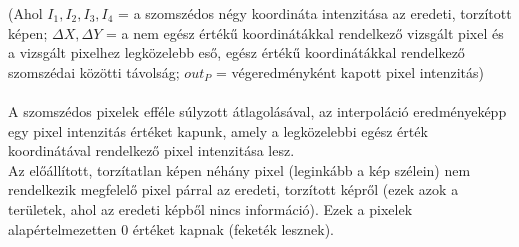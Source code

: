 \documentclass[12pt]{report}
\begin{document}
\begin{enumerate}
\begin{itemize}
                        (Ahol $I_1, I_2, I_3, I_4$ = a szomszédos négy koordináta intenzitása az eredeti, torzított képen; $\Delta X, \Delta Y$ = a nem egész értékű koordinátákkal rendelkező vizsgált pixel és a vizsgált pixelhez legközelebb eső, egész értékű koordinátákkal rendelkező szomszédai közötti távolság; $out_P$ = végeredményként kapott pixel intenzitás)\\\\
                    A szomszédos pixelek efféle súlyzott átlagolásával, az interpoláció eredményeképp egy pixel intenzitás értéket kapunk, amely a legközelebbi egész érték koordinátával rendelkező pixel intenzitása lesz.\\
                    Az előállított, torzítatlan képen néhány pixel (leginkább a kép szélein) nem rendelkezik megfelelő pixel párral az eredeti, torzított képről (ezek azok a területek, ahol az eredeti képből nincs információ). Ezek a pixelek alapértelmezetten 0 értéket kapnak (feketék lesznek). 
                        \end{itemize}
                \end{enumerate}
\end{document}
